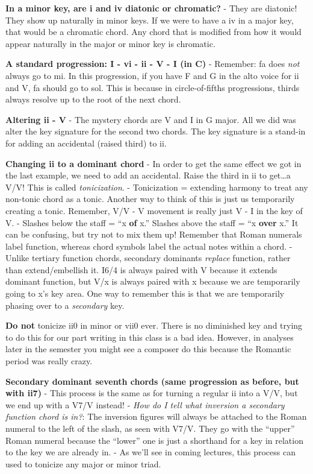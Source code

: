 \documentclass{book}
\begin{document}
\textbf{In a minor key, are i and iv diatonic or chromatic?} - They are
diatonic! They show up naturally in minor keys. If we were to have a iv in a
major key, that would be a chromatic chord. Any chord that is modified from
how it would appear naturally in the major or minor key is chromatic.

\textbf{A standard progression: I - vi - ii - V - I (in C)} - Remember: fa
does \emph{not} always go to mi. In this progression, if you have F and G in
the alto voice for ii and V, fa should go to sol. This is because in
circle-of-fifths progressions, thirds always resolve up to the root of the
next chord.

\textbf{Altering ii - V} - The mystery chords are V and I in G major. All we
did was alter the key signature for the second two chords. The key signature
is a stand-in for adding an accidental (raised third) to ii.

\textbf{Changing ii to a dominant chord} - In order to get the same effect we
got in the last example, we need to add an accidental. Raise the third in ii
to get\ldots a V/V! This is called \emph{tonicization}. - Tonicization =
extending harmony to treat any non-tonic chord as a tonic. Another way to
think of this is just us temporarily creating a tonic. Remember, V/V - V
movement is really just V - I in the key of V. - Slashes below the staff = ``x
\textbf{of} x.'' Slashes above the staff = ``x \textbf{over} x.'' It can be
confusing, but try not to mix them up! Remember that Roman numerals label
function, whereas chord symbols label the actual notes within a chord. -
Unlike tertiary function chords, secondary dominants \emph{replace} function,
rather than extend/embellish it. I6/4 is always paired with V because it
extends dominant function, but V/x is always paired with x because we are
temporarily going to x's key area. One way to remember this is that we are
temporarily phasing over to a \emph{secondary} key.

\textbf{Do not} tonicize ii0 in minor or vii0 ever. There is no diminished key
and trying to do this for our part writing in this class is a bad idea.
However, in analyses later in the semester you might see a composer do this
because the Romantic period was really crazy.

\textbf{Secondary dominant seventh chords (same progression as before, but
with ii7)} - This process is the same as for turning a regular ii into a V/V,
but we end up with a V7/V instead! - \emph{How do I tell what inversion a
secondary function chord is in?}: The inversion figures will always be
attached to the Roman numeral to the left of the slash, as seen with V7/V.
They go with the ``upper'' Roman numeral because the ``lower'' one is just a
shorthand for a key in relation to the key we are already in. - As we'll see
in coming lectures, this process can used to tonicize any major or minor
triad.
\end{document}
